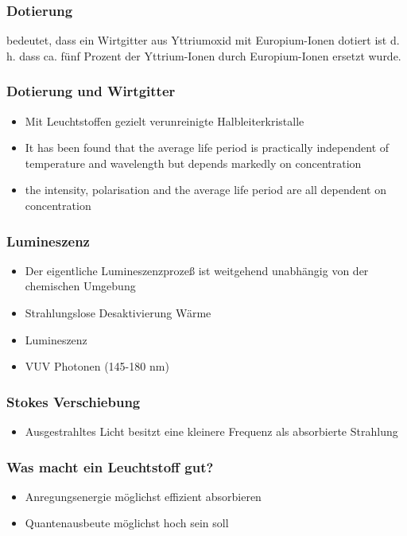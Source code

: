 \documentclass{beamer}
\begin{document}
\begin{frame}[t]\frametitle{Dotierung}
 bedeutet, dass ein Wirtgitter aus Yttriumoxid mit Europium-Ionen dotiert ist
 d. h. dass ca. fünf Prozent der Yttrium-Ionen durch Europium-Ionen ersetzt wurde.


\end{frame}


\begin{frame}[t]\frametitle{Dotierung und Wirtgitter}
\begin{itemize}
  \item Mit Leuchtstoffen gezielt verunreinigte Halbleiterkristalle
  \item It has been found that the average life period is practically independent of temperature and wavelength but depends markedly on concentration
  \item the intensity, polarisation and the average life period are all dependent on concentration
\end{itemize}


\end{frame}

  \begin{frame}
  \frametitle{Lumineszenz}
    \begin{itemize}
    \item Der eigentliche Lumineszenzprozeß ist weitgehend unabhängig von der chemischen Umgebung
    \item Strahlungslose Desaktivierung  Wärme
    \item Lumineszenz 
    \item VUV Photonen (145-180 nm)
    \end{itemize}
  \end{frame}

\begin{frame}
  \frametitle{Stokes Verschiebung}
    \begin{itemize}
    \item Ausgestrahltes Licht besitzt eine kleinere Frequenz als absorbierte Strahlung
    \end{itemize}
  \end{frame}


\begin{frame}[t]\frametitle{Was macht ein Leuchtstoff gut?}
\begin{itemize}
 \item Anregungsenergie möglichst effizient absorbieren
 \item Quantenausbeute möglichst hoch sein soll
\end{itemize}
\end{frame}
\end{document}
